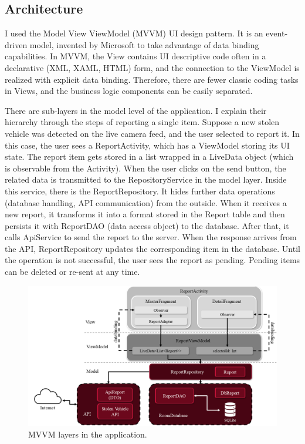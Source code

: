 \subsection{Architecture}

I used the Model View ViewModel (MVVM) UI design pattern. It is an event-driven model, invented by Microsoft to take advantage of data binding capabilities. In MVVM, the View contains UI descriptive code often in a declarative (XML, XAML, HTML) form, and the connection to the ViewModel is realized with explicit data binding. Therefore, there are fewer classic coding tasks in Views, and the business logic components can be easily separated.

There are sub-layers in the model level of the application. I explain their hierarchy through the steps of reporting a single item. Suppose a new stolen vehicle was detected on the live camera feed, and the user selected to report it. In this case, the user sees a ReportActivity, which has a ViewModel storing its UI state. The report item gets stored in a list wrapped in a LiveData object (which is observable from the Activity). When the user clicks on the send button, the related data is transmitted to the RepositoryService in the model layer. Inside this service, there is the ReportRepository. It hides further data operations (database handling, API communication) from the outside. When it receives a new report, it transforms it into a format stored in the Report table and then persists it with ReportDAO (data access object) to the database. After that, it calls ApiService to send the report to the server. When the response arrives from the API, ReportRepository updates the corresponding item in the database. Until the operation is not successful, the user sees the report as pending. Pending items can be deleted or re-sent at any time.

\begin{figure}[htb]
 \centerline{\includegraphics[width=1.0\columnwidth]{.//Figure/System/AndroidArchitecture.png}}
 \caption{MVVM layers in the application.}
 \label{fig:simple}
\end{figure}

